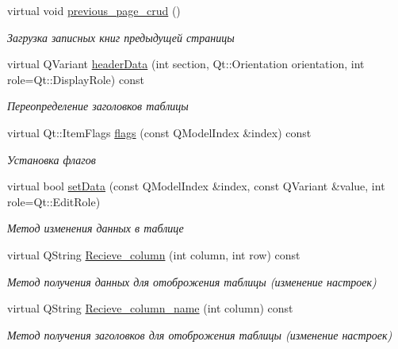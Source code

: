 \begin{DoxyCompactItemize}
\mbox{\label{class_m_t_m___crud_aa56390806c0426841d2ce396ab7378b4}} 
virtual void \mbox{\hyperlink{class_m_t_m___crud_aa56390806c0426841d2ce396ab7378b4}{previous\+\_\+page\+\_\+crud}} ()
\begin{DoxyCompactList}\small\item\em Загрузка записных книг предыдущей страницы \end{DoxyCompactList}\item 
\mbox{\label{class_m_t_m___crud_a57e77af27e75e5dd57295a6a43d6709c}} 
virtual Q\+Variant \mbox{\hyperlink{class_m_t_m___crud_a57e77af27e75e5dd57295a6a43d6709c}{header\+Data}} (int section, Qt\+::\+Orientation orientation, int role=Qt\+::\+Display\+Role) const
\begin{DoxyCompactList}\small\item\em Переопределение заголовков таблицы \end{DoxyCompactList}\item 
\mbox{\label{class_m_t_m___crud_a4f94778e462130a0af3ed423fde452e8}} 
virtual Qt\+::\+Item\+Flags \mbox{\hyperlink{class_m_t_m___crud_a4f94778e462130a0af3ed423fde452e8}{flags}} (const Q\+Model\+Index \&index) const
\begin{DoxyCompactList}\small\item\em Установка флагов \end{DoxyCompactList}\item 
\mbox{\label{class_m_t_m___crud_a9b86a08c0ecbe4f112cb0077f33896f2}} 
virtual bool \mbox{\hyperlink{class_m_t_m___crud_a9b86a08c0ecbe4f112cb0077f33896f2}{set\+Data}} (const Q\+Model\+Index \&index, const Q\+Variant \&value, int role=Qt\+::\+Edit\+Role)
\begin{DoxyCompactList}\small\item\em Метод изменения данных в таблице \end{DoxyCompactList}\item 
\mbox{\label{class_m_t_m___crud_ad42dd92a9ebbf635fd5a04042f8c3298}} 
virtual Q\+String \mbox{\hyperlink{class_m_t_m___crud_ad42dd92a9ebbf635fd5a04042f8c3298}{Recieve\+\_\+column}} (int column, int row) const
\begin{DoxyCompactList}\small\item\em Метод получения данных для отоброжения таблицы (изменение настроек) \end{DoxyCompactList}\item 
\mbox{\label{class_m_t_m___crud_a83bd526c6d6743b554c86b1691503e0b}} 
virtual Q\+String \mbox{\hyperlink{class_m_t_m___crud_a83bd526c6d6743b554c86b1691503e0b}{Recieve\+\_\+column\+\_\+name}} (int column) const
\begin{DoxyCompactList}\small\item\em Метод получения заголовков для отоброжения таблицы (изменение настроек) \end{DoxyCompactList}\end{DoxyCompactItemize}

